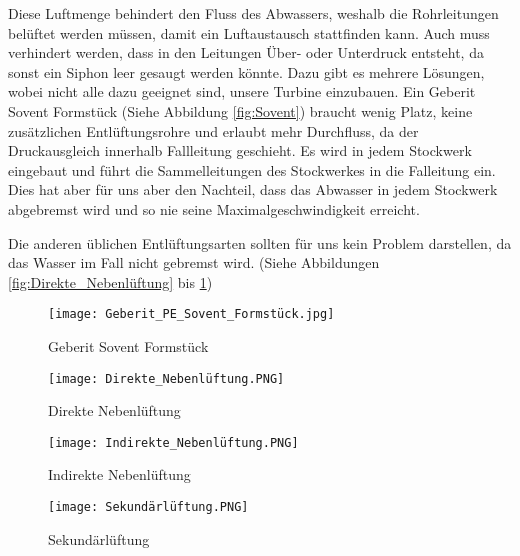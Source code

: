 Diese Luftmenge behindert den Fluss des Abwassers, weshalb die Rohrleitungen belüftet werden müssen, damit ein Luftaustausch stattfinden kann. Auch muss verhindert werden, dass in den Leitungen Über- oder Unterdruck entsteht, da sonst ein Siphon leer gesaugt werden könnte. Dazu gibt es mehrere Lösungen, wobei nicht alle dazu geeignet sind, unsere Turbine einzubauen. Ein Geberit Sovent Formstück (Siehe Abbildung \ref{fig:Sovent}) braucht wenig Platz, keine zusätzlichen Entlüftungsrohre und erlaubt mehr Durchfluss, da der Druckausgleich innerhalb Fallleitung geschieht. Es wird in jedem Stockwerk eingebaut und führt die Sammelleitungen des Stockwerkes in die Falleitung ein. Dies hat aber für uns aber den Nachteil, dass das Abwasser in jedem Stockwerk abgebremst wird und so nie seine Maximalgeschwindigkeit erreicht.

Die anderen üblichen Entlüftungsarten sollten für uns kein Problem darstellen, da das Wasser im Fall nicht gebremst wird. (Siehe Abbildungen \ref{fig:Direkte_Nebenlüftung} bis \ref{fig:Sekundärlüftung})

\begin{figure}[h]
    \centering
    \begin{minipage}[t]{0.45\linewidth}
    	\centering
    	\texttt{[image: Geberit\_PE\_Sovent\_Formstück.jpg]}
     	\caption{Geberit Sovent Formstück \cite{geberit}}
		\label{fig:Sovent}
    \end{minipage}
    \;
    \begin{minipage}[t]{0.45\linewidth}
    	\centering
    	\texttt{[image: Direkte\_Nebenlüftung.PNG]}
     	\caption{Direkte Nebenlüftung \cite{docplayer}}
        \label{fig:Direkte_Nebenlüftung}
    \end{minipage}
    \newline
    \begin{minipage}[t]{0.45\linewidth}
    	\centering
    	\texttt{[image: Indirekte\_Nebenlüftung.PNG]}
        \caption{Indirekte Nebenlüftung \cite{docplayer}}
        \label{fig:Indirekte_Nebenlüftung}    
    \end{minipage}
    \;
    \begin{minipage}[t]{0.45\linewidth}
    	\centering
    	\texttt{[image: Sekundärlüftung.PNG]}
        \caption{Sekundärlüftung \cite{docplayer}}
        \label{fig:Sekundärlüftung}    
    \end{minipage}
\end{figure}


